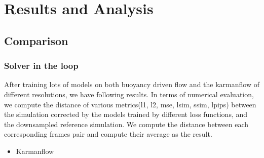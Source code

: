 \documentclass[a4paper,12pt,twoside]{report}
\begin{document}
\chapter{Results and Analysis}

\section{Comparison}

\subsection{Solver in the loop}
After training lots of models on both buoyancy driven flow and the karmanflow of different resolutions, we have following results. In terms of numerical evaluation, we compute the distance of various metrics(l1, l2, mse, lsim, ssim, lpips) between the simulation corrected by the models trained by different loss functions, and the downsampled reference simulation. We compute the distance between each corresponding frames pair and compute their average as the result.
\begin{itemize}
  \item Karmanflow
\end{itemize}
\end{document}

